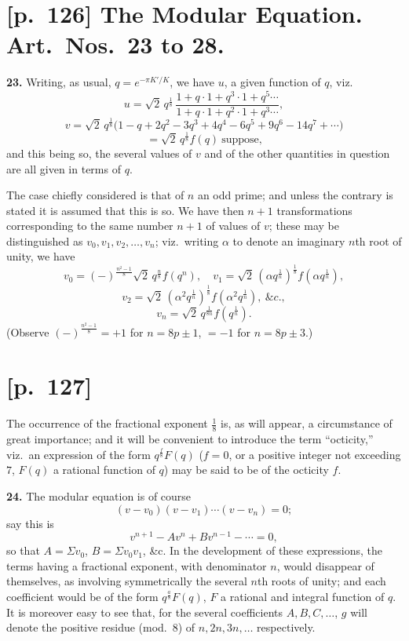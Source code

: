 \documentclass[11pt]{article}
\begin{document}
\section*{[p.~126] The Modular Equation. Art.\ Nos.\ 23 to 28.}

\textbf{23.} Writing, as usual, $q = e^{-\pi K'/K}$, we have $u$, a given
function of $q$, viz.
\[
u = \sqrt{2}\,q^{\frac{1}{8}}\,\frac{1+q\cdot 1+q^3\cdot 1+q^5\cdots}{1+q\cdot 1+q^2\cdot 1+q^3\cdots},
\]
\[
v = \sqrt{2}\,q^{\frac{1}{8}}\bigl(1 - q + 2q^2 - 3q^3 + 4q^4 - 6q^5 + 9q^6 - 14q^7 + \cdots\bigr)
\]
\[
= \sqrt{2}\,q^{\frac{1}{8}} f(q) \ \text{suppose,}
\]
and this being so, the several values of $v$ and of the other quantities in
question are all given in terms of $q$.

The case chiefly considered is that of $n$ an odd prime; and unless the
contrary is stated it is assumed that this is so. We have then $n+1$
transformations corresponding to the same number $n+1$ of values of $v$;
these may be distinguished as $v_0, v_1, v_2, \ldots, v_n$; viz.\ writing
$\alpha$ to denote an imaginary $n$th root of unity, we have
\[
v_0 = (-)^{\frac{n^2-1}{8}}\sqrt{2}\,q^{\frac{n}{8}}f(q^n),\quad
v_1 = \sqrt{2}\,(\alpha q^{\frac{1}{n}})^{\frac{1}{8}} f(\alpha q^{\frac{1}{n}}),
\]
\[
v_2 = \sqrt{2}\,(\alpha^2 q^{\frac{1}{n}})^{\frac{1}{8}} f(\alpha^2 q^{\frac{1}{n}}),\ \&c.,
\]
\[
v_n = \sqrt{2}\,q^{\frac{1}{8n}} f(q^{\frac{1}{n}}).
\]
(Observe $(-)^{\frac{n^2-1}{8}} = +1$ for $n = 8p\pm 1$, $= -1$ for $n = 8p\pm 3$.)

\section*{[p.~127]}

The occurrence of the fractional exponent $\tfrac{1}{8}$ is, as will appear,
a circumstance of great importance; and it will be convenient to introduce
the term ``octicity,'' viz.\ an expression of the form $q^{\frac{f}{8}}F(q)$
($f = 0$, or a positive integer not exceeding $7$, $F(q)$ a rational
function of $q$) may be said to be of the octicity $f$.

\medskip
\textbf{24.} The modular equation is of course
\[
(v - v_0)(v - v_1)\cdots(v - v_n) = 0;
\]
say this is
\[
v^{n+1} - A v^n + B v^{n-1} - \cdots = 0,
\]
so that $A = \Sigma v_0$, $B = \Sigma v_0 v_1$, \&c. In the development of these
expressions, the terms having a fractional exponent, with denominator $n$,
would disappear of themselves, as involving symmetrically the several
$n$th roots of unity; and each coefficient would be of the form
$q^{\frac{a}{8}} F(q)$, $F$ a rational and integral function of $q$. It is
moreover easy to see that, for the several coefficients $A, B, C, \ldots$,
$g$ will denote the positive residue (mod.\ 8) of $n, 2n, 3n,\ldots$
respectively.
\end{document}

